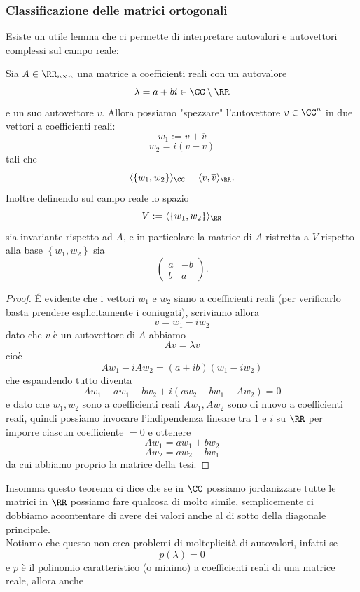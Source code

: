 \documentclass[11pt]{scrartcl}
\begin{document}
   	 \subsubsection{Classificazione delle matrici ortogonali}
   	 Esiste un utile lemma che ci permette di interpretare autovalori e autovettori complessi sul campo reale:
   	 \begin{lemma}
   	 	Sia $A\in \RR_{n\times n}$ una matrice a coefficienti reali con un autovalore 
   	 	$$\lambda = a+bi\in \CC\setminus \RR$$
   	 	e un suo autovettore $v$. Allora possiamo "spezzare" l'autovettore $v\in\CC^n$ in due vettori a coefficienti reali:
   	 	$$w_1:=v+\overline{v}$$
   	 	$$w_2=i\left(v-\overline{v}\right)$$
   	 	tali che 
   	 	$$\langle \left\{w_1,w_2\right\}\rangle_{\CC}=\langle v,\overline{v}\rangle_{\RR}.$$
   	 	Inoltre definendo sul campo reale lo spazio 
   	 	$$V:=\langle \left\{w_1,w_2\right\}\rangle_\RR$$
   	 	sia invariante rispetto ad $A$, e in particolare la matrice di $A$ ristretta a $V$ rispetto alla base $\left\{w_1,w_2\right\}$ sia
   	 	$$\begin{pmatrix}
   	 		a & -b \\
   	 		b &  a
   	 	\end{pmatrix}.$$
   	 \end{lemma}
   	 \begin{proof}
   	 	\'E evidente che i vettori $w_1$ e $w_2$ siano a coefficienti reali (per verificarlo basta prendere esplicitamente i coniugati), scriviamo allora
   	 	$$v=w_1-iw_2$$
   	 	dato che $v$ è un autovettore di $A$ abbiamo
   	 	$$Av=\lambda v$$
   	 	cioè
   	 	$$Aw_1-iAw_2=(a+ib)(w_1-iw_2)$$
   	 	che espandendo tutto diventa
   	 	$$Aw_1-aw_1-bw_2+i\left(aw_2-bw_1-Aw_2\right)=0$$
   	 	e dato che $w_1,w_2$ sono a coefficienti reali $Aw_1,Aw_2$ sono di nuovo a coefficienti reali, quindi possiamo invocare l'indipendenza lineare tra $1$ e $i$ su $\RR$ per imporre ciascun coefficiente $=0$ e ottenere
   	 	$$Aw_1=aw_1+bw_2$$
   	 	$$Aw_2=aw_2-bw_1$$
   	 	da cui abbiamo proprio la matrice della tesi. 
   	 \end{proof}
   	 Insomma questo teorema ci dice che se in $\CC$ possiamo jordanizzare tutte le matrici in $\RR$ possiamo fare qualcosa di molto simile, semplicemente ci dobbiamo accontentare di avere dei valori anche al di sotto della diagonale principale. \\
   	 Notiamo che questo non crea problemi di molteplicità di autovalori, infatti se 
   	 $$p(\lambda)=0$$
   	 e $p$ è il polinomio caratteristico (o minimo) a coefficienti reali di una matrice reale, allora anche 
\end{document}
